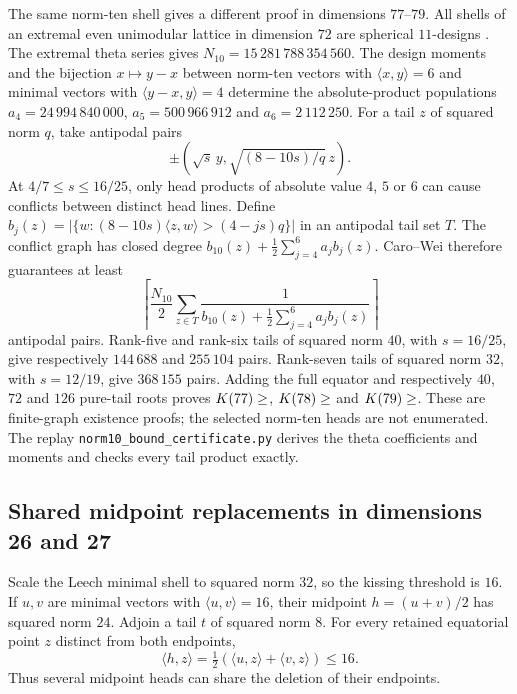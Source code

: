 \documentclass[11pt]{amsart}
\theoremstyle{remark}
\newcommand{\ip}[2]{\langle #1,#2\rangle}
\begin{document}
The same norm-ten shell gives a different proof in dimensions $77$--$79$.
All shells of an extremal even unimodular lattice in dimension $72$ are
spherical $11$-designs \cite{venkov1984}. The extremal theta series gives
$N_{10}=15\,281\,788\,354\,560$. The design moments and the bijection
$x\mapsto y-x$ between norm-ten vectors with $\ip{x}{y}=6$ and minimal
vectors with $\ip{y-x}{y}=4$ determine the absolute-product populations
$a_4=24\,994\,840\,000$, $a_5=500\,966\,912$ and $a_6=2\,112\,250$.
For a tail $z$ of squared norm $q$, take antipodal pairs
\[
 \pm\left(\sqrt{s}\,y,\sqrt{(8-10s)/q}\,z\right).
\]
At $4/7\le s\le16/25$, only head products of absolute value $4$, $5$ or $6$
can cause conflicts between distinct head lines. Define
$b_j(z)=|\{w:(8-10s)\ip{z}{w}>(4-js)q\}|$ in an antipodal tail set $T$.
The conflict graph has closed degree
$b_{10}(z)+\tfrac12\sum_{j=4}^6 a_jb_j(z)$.
Caro--Wei therefore guarantees at least
\[
 \left\lceil\frac{N_{10}}2\sum_{z\in T}
 \frac{1}{b_{10}(z)+\frac12\sum_{j=4}^6a_jb_j(z)}\right\rceil
\]
antipodal pairs. Rank-five and rank-six tails of squared norm $40$, with
$s=16/25$, give respectively $144\,688$ and $255\,104$ pairs. Rank-seven
tails of squared norm $32$, with $s=12/19$, give $368\,155$ pairs. Adding
the full equator and respectively $40$, $72$ and $126$ pure-tail roots
proves $K(77)\ge\Kcur{77}$, $K(78)\ge\Kcur{78}$ and $K(79)\ge\Kcur{79}$.
These are finite-graph existence proofs; the selected norm-ten heads are
not enumerated. The replay \texttt{norm10\_bound\_certificate.py} derives
the theta coefficients and moments and checks every tail product exactly.

\subsection{Shared midpoint replacements in dimensions 26 and 27}\label{ss:d2627current}

Scale the Leech minimal shell to squared norm $32$, so the kissing threshold
is $16$. If $u,v$ are minimal vectors with $\ip{u}{v}=16$, their midpoint
$h=(u+v)/2$ has squared norm $24$. Adjoin a tail $t$ of squared norm $8$.
For every retained equatorial point $z$ distinct from both endpoints,
\[
  \ip{h}{z}=\tfrac12(\ip{u}{z}+\ip{v}{z})\le16.
\]
Thus several midpoint heads can share the deletion of their endpoints.
\end{document}
